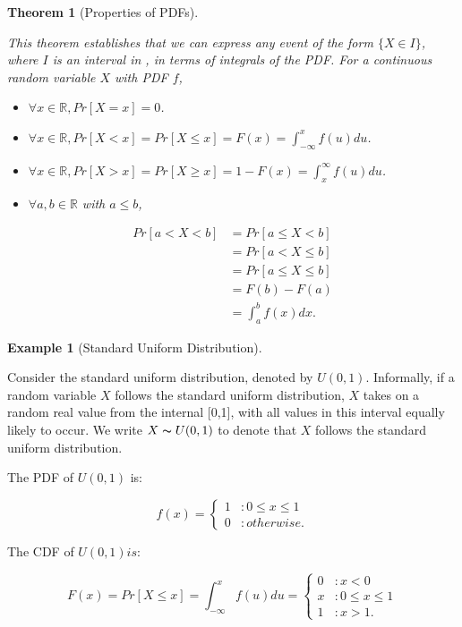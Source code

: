 \documentclass[
]{article}
\providecommand{\tightlist}{%
  \setlength{\itemsep}{0pt}\setlength{\parskip}{0pt}}
\newtheorem{theorem}{Theorem}[section]
\theoremstyle{definition}
\theoremstyle{definition}
\newtheorem{example}{Example}[section]
\theoremstyle{definition}
\theoremstyle{remark}
\begin{document}
\begin{theorem}[Properties of PDFs]
\protect\hypertarget{thm:unlabeled-div-34}{}\label{thm:unlabeled-div-34}

This theorem establishes that we can express any event of the form \(\{X \in I\}\), where \(I\) is an interval in , in terms of integrals of the PDF. For a continuous random variable \(X\) with PDF \(f\),

\begin{itemize}
\tightlist
\item
  \(\forall x \in \mathbb{R}, Pr[X = x] = 0\).
\item
  \(\forall x \in \mathbb{R}, Pr[X < x] = Pr[X \leq x] = F(x) = \int_{-\infty}^{x} f(u)du\).
\item
  \(\forall x \in \mathbb{R}, Pr[X > x] = Pr[X \geq x] = 1 - F(x) = \int_{x}^{\infty} f(u)du\).
\item
  \(\forall a,b \in \mathbb{R}\) with \(a \leq b\),
\end{itemize}

\[\begin{align} Pr[a < X < b] &= Pr[a \leq X < b] \\ &= Pr[a < X \leq b] \\ &= Pr[a \leq X \leq b] \\ &= F(b) - F(a) \\ &= \int_a^b f(x)dx. \end{align}\]

\end{theorem}

\begin{example}[Standard Uniform Distribution]
\protect\hypertarget{exm:unlabeled-div-35}{}\label{exm:unlabeled-div-35}

Consider the standard uniform distribution, denoted by \(U(0,1)\). Informally, if a random variable \(X\) follows the standard uniform distribution, \(X\) takes on a random real value from the internal {[}0,1{]}, with all values in this interval equally likely to occur. We write \(X \thicksim U(0,1)\) to denote that \(X\) follows the standard uniform distribution.

The PDF of \(U(0,1)\) is:

\[f(x) = \begin{cases} 1 & : 0 \leq x \leq 1 \\ 0 & : otherwise.  \end{cases}\]

The CDF of \(U(0,1) is\):

\[F(x) = Pr[X \leq x] = \int_{-\infty}^x f(u)du = \begin{cases} 0 & : x < 0 \\ x & : 0 \leq x \leq 1 \\ 1 & : x > 1.  \end{cases}\]

\end{example}
\end{document}
